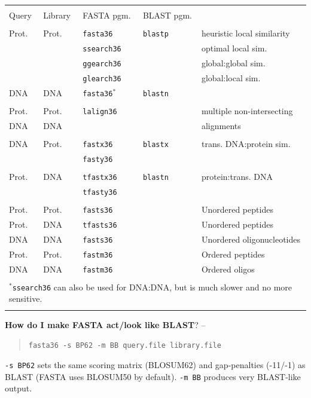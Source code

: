 \documentclass[11pt]{article}
\begin{document}
\begin{tabular}{l l l l l }
\hline \\[-1.0ex]
Query & Library & FASTA pgm. & BLAST pgm. & \\[1.2ex]
\hline \\[-1.0ex]
Prot. & Prot. & \texttt{fasta36} & \texttt{blastp} & heuristic local similarity \\
 &  & \texttt{ssearch36} &  & optimal local sim.\\
 &  & \texttt{ggearch36} &  & global:global sim. \\
 &  & \texttt{glearch36} &  & global:local sim.\\
DNA & DNA & \texttt{fasta36}$^*$ & \texttt{blastn} & \\[1.2ex]
\hline \\[-1.0ex]
Prot. & Prot. & \texttt{lalign36} & & multiple non-intersecting \\
DNA & DNA & & & alignments \\[1.2ex]
\hline \\[-1.0ex]
DNA & Prot. & \texttt{fastx36} & \texttt{blastx} & trans. DNA:protein sim. \\ 
 &  & \texttt{fasty36} & & \\[1.2ex]
\hline \\[-1.0ex]
Prot. & DNA & \texttt{tfastx36} & \texttt{blastn} & protein:trans. DNA \\
 &  & \texttt{tfasty36} & & \\[1.2ex]
\hline \\[-1.0ex]
Prot. & Prot. & \texttt{fasts36} & & Unordered peptides \\
Prot. & DNA & \texttt{tfasts36} & & Unordered peptides \\
DNA & DNA & \texttt{fasts36} & & Unordered oligonucleotides \\
Prot. & Prot. & \texttt{fastm36} & & Ordered peptides \\
DNA & DNA & \texttt{fastm36} & & Ordered oligos \\[1.2 ex]
\hline \\[-1.0ex]
\multicolumn{5}{l}{$^*$\texttt{ssearch36} can also be used for DNA:DNA, but is much slower and no more sensitive.}\\[0.2ex]
\hline \\
\end{tabular}

\needspace{4 ex}
{\noindent}\textbf{How do I make FASTA act/look like BLAST}? --
\vspace{-0.5ex}
\begin{quote}
\texttt{fasta36 -s BP62 -m BB query.file library.file}
\end{quote}
\vspace{-0.5ex}
\texttt{-s BP62} sets the same scoring matrix (BLOSUM62) and
gap-penalties (-11/-1) as BLAST (FASTA uses BLOSUM50 by
default). \texttt{-m BB} produces very BLAST-like output.
\end{document}
